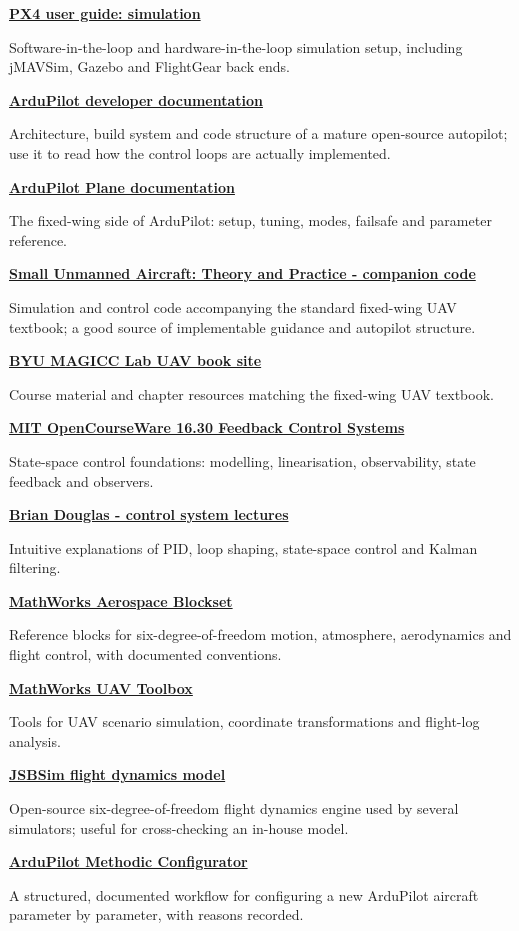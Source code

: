 \documentclass[11pt,a4paper]{article}
\newcommand{\Resource}[3]{%
  \begin{resourcebox}
    \href{#2}{\textbf{\color{DARESTeal}#1}}\par
    {\small #3}
  \end{resourcebox}
}
\begin{document}
\Resource
  {PX4 user guide: simulation}
  {https://docs.px4.io/main/en/simulation/}
  {Software-in-the-loop and hardware-in-the-loop simulation setup, including jMAVSim, Gazebo and FlightGear back ends.}

\Resource
  {ArduPilot developer documentation}
  {https://ardupilot.org/dev/}
  {Architecture, build system and code structure of a mature open-source autopilot; use it to read how the control loops are actually implemented.}

\Resource
  {ArduPilot Plane documentation}
  {https://ardupilot.org/plane/}
  {The fixed-wing side of ArduPilot: setup, tuning, modes, failsafe and parameter reference.}

\Resource
  {Small Unmanned Aircraft: Theory and Practice - companion code}
  {https://github.com/randybeard/uavbook}
  {Simulation and control code accompanying the standard fixed-wing UAV textbook; a good source of implementable guidance and autopilot structure.}

\Resource
  {BYU MAGICC Lab UAV book site}
  {https://uavbook.byu.edu/}
  {Course material and chapter resources matching the fixed-wing UAV textbook.}

\Resource
  {MIT OpenCourseWare 16.30 Feedback Control Systems}
  {https://ocw.mit.edu/courses/16-30-feedback-control-systems-fall-2010/}
  {State-space control foundations: modelling, linearisation, observability, state feedback and observers.}

\Resource
  {Brian Douglas - control system lectures}
  {https://engineeringmedia.com/}
  {Intuitive explanations of PID, loop shaping, state-space control and Kalman filtering.}

\Resource
  {MathWorks Aerospace Blockset}
  {https://www.mathworks.com/help/aeroblks/}
  {Reference blocks for six-degree-of-freedom motion, atmosphere, aerodynamics and flight control, with documented conventions.}

\Resource
  {MathWorks UAV Toolbox}
  {https://www.mathworks.com/help/uav/}
  {Tools for UAV scenario simulation, coordinate transformations and flight-log analysis.}

\Resource
  {JSBSim flight dynamics model}
  {https://jsbsim.sourceforge.net/}
  {Open-source six-degree-of-freedom flight dynamics engine used by several simulators; useful for cross-checking an in-house model.}

\Resource
  {ArduPilot Methodic Configurator}
  {https://github.com/ArduPilot/MethodicConfigurator}
  {A structured, documented workflow for configuring a new ArduPilot aircraft parameter by parameter, with reasons recorded.}
\end{document}
